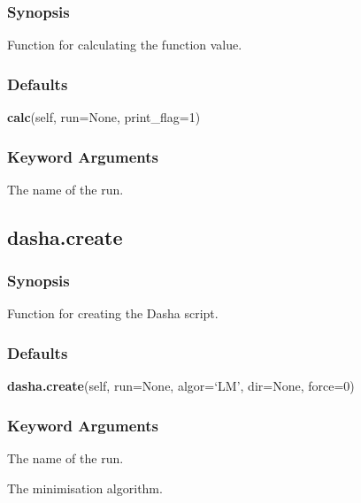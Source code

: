   
 \subsubsection{Synopsis} 

 Function for calculating the function value. 
  

  
 \subsubsection{Defaults} 

 \textsf{\textbf{calc}(self, run=None, print\_flag=1)} 

  
 \subsubsection{Keyword Arguments} 

   The name of the run.  

  

  

 \newpage 

 \subsection{dasha.create} 

  
 \subsubsection{Synopsis} 

 Function for creating the Dasha script. 
  

  
 \subsubsection{Defaults} 

 \textsf{\textbf{dasha.create}(self, run=None, algor=`LM', dir=None, force=0)} 

  
 \subsubsection{Keyword Arguments} 

   The name of the run.   

   The minimisation algorithm.   

